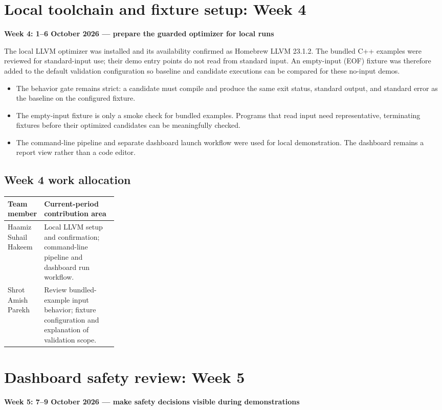 \documentclass[11pt]{article}
\begin{document}
\section{Local toolchain and fixture setup: Week 4}
\textbf{Week 4: 1--6 October 2026 --- prepare the guarded optimizer for local runs}

The local LLVM optimizer was installed and its availability confirmed as Homebrew LLVM 23.1.2. The bundled C++ examples were reviewed for standard-input use; their demo entry points do not read from standard input. An empty-input (EOF) fixture was therefore added to the default validation configuration so baseline and candidate executions can be compared for these no-input demos.

\begin{itemize}
  \item The behavior gate remains strict: a candidate must compile and produce the same exit status, standard output, and standard error as the baseline on the configured fixture.
  \item The empty-input fixture is only a smoke check for bundled examples. Programs that read input need representative, terminating fixtures before their optimized candidates can be meaningfully checked.
  \item The command-line pipeline and separate dashboard launch workflow were used for local demonstration. The dashboard remains a report view rather than a code editor.
\end{itemize}

\subsection*{Week 4 work allocation}
\begin{tabularx}{\linewidth}{@{}p{0.25\linewidth}Y@{}}
\toprule
\textbf{Team member} & \textbf{Current-period contribution area} \\
\midrule
Haamiz Suhail Hakeem & Local LLVM setup and confirmation; command-line pipeline and dashboard run workflow. \\
Shrot Amish Parekh & Review bundled-example input behavior; fixture configuration and explanation of validation scope. \\
\bottomrule
\end{tabularx}

\section{Dashboard safety review: Week 5}
\textbf{Week 5: 7--9 October 2026 --- make safety decisions visible during demonstrations}
\end{document}
